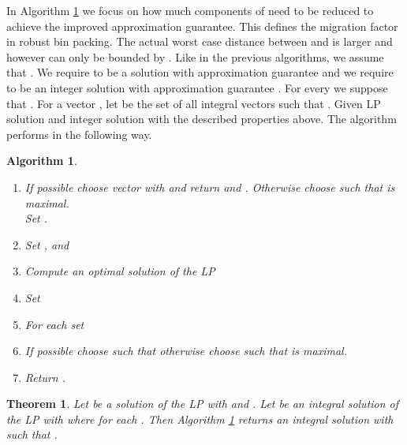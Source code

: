 \documentclass[a4paper,11pt]{article}
\newtheorem{thm}{Theorem}
\newtheorem{algo}{Algorithm}
\begin{document}
In Algorithm \ref{alg3} we focus on how much components of  need to be reduced to achieve the improved approximation guarantee.
This defines the migration factor in robust bin packing. The actual worst case distance between  and  is 
larger and however can only
be bounded by . Like in the previous algorithms, we assume that 
.
We require  to be a solution with
approximation guarantee  and
we require  to be an integer solution with
approximation guarantee . For every  we suppose that
.
For a vector , let  be the set of all integral vectors 
 such that .
Given LP solution  and integer solution  with the described properties above. 
The algorithm performs in the following
way.
  \begin{algo}\label{alg3}
\ 
  \begin{enumerate}
  	\item If possible choose vector  with  and return  and .
  	 Otherwise choose  such that  is maximal.\\
  Set .
  \item Set , 
  and 
  \item Compute an optimal solution  of the LP 
	\item Set  
	\item For each  set 
	\item If possible choose  such that  otherwise
  choose  such that  is maximal.
  \item Return .
  \end{enumerate}
  \end{algo}
\begin{thm}\label{thm6}
	 Let  be a solution of the LP with  and . Let  be an integral
	 solution of the LP with   where  for each 
	 .
	Then Algorithm \ref{alg3} returns an integral solution
	 with  such that
	.
\end{thm}
\end{document}
